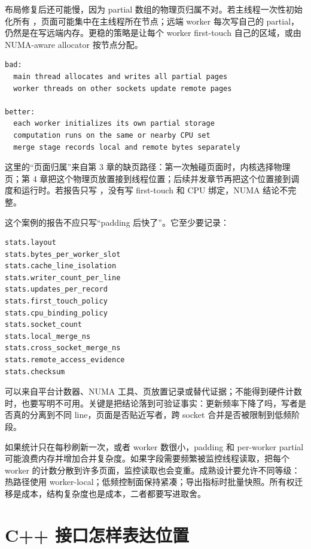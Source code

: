 布局修复后还可能慢，因为 partial 数组的物理页归属不对。若主线程一次性初始化所有 ，页面可能集中在主线程所在节点；远端 worker 每次写自己的 partial，仍然是在写远端内存。更稳的策略是让每个 worker first-touch 自己的区域，或由 NUMA-aware allocator 按节点分配。

\begin{lstlisting}[numbers=none,caption={NUMA 初始化和计算要匹配}]
bad:
  main thread allocates and writes all partial pages
  worker threads on other sockets update remote pages

better:
  each worker initializes its own partial storage
  computation runs on the same or nearby CPU set
  merge stage records local and remote bytes separately
\end{lstlisting}

这里的“页面归属”来自第 3 章的缺页路径：第一次触碰页面时，内核选择物理页；第 4 章把这个物理页放置接到线程位置；后续并发章节再把这个位置接到调度和运行时。若报告只写 ，没有写 first-touch 和 CPU 绑定，NUMA 结论不完整。

这个案例的报告不应只写“padding 后快了”。它至少要记录：

\begin{lstlisting}[numbers=none,caption={一致性和 NUMA 案例报告字段}]
stats.layout
stats.bytes_per_worker_slot
stats.cache_line_isolation
stats.writer_count_per_line
stats.updates_per_record
stats.first_touch_policy
stats.cpu_binding_policy
stats.socket_count
stats.local_merge_ns
stats.cross_socket_merge_ns
stats.remote_access_evidence
stats.checksum
\end{lstlisting}

 可以来自平台计数器、NUMA 工具、页放置记录或替代证据；不能得到硬件计数时，也要写明不可用。关键是把结论落到可验证事实：更新频率下降了吗，写者是否真的分离到不同 line，页面是否贴近写者，跨 socket 合并是否被限制到低频阶段。

如果统计只在每秒刷新一次，或者 worker 数很小，padding 和 per-worker partial 可能浪费内存并增加合并复杂度。如果字段需要频繁被监控线程读取，把每个 worker 的计数分散到许多页面，监控读取也会变重。成熟设计要允许不同等级：热路径使用 worker-local；低频控制面保持紧凑；导出指标时批量快照。所有权迁移是成本，结构复杂度也是成本，二者都要写进取舍。

\section{C++ 接口怎样表达位置}

